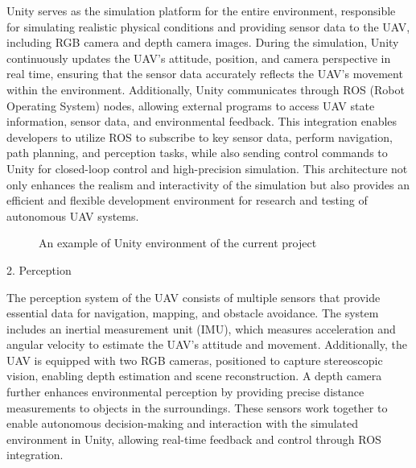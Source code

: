 \documentclass{article}
\begin{document}
Unity serves as the simulation platform for the entire environment, responsible for simulating realistic physical conditions and providing sensor data to the UAV, including RGB camera and depth camera images. During the simulation, Unity continuously updates the UAV's attitude, position, and camera perspective in real time, ensuring that the sensor data accurately reflects the UAV’s movement within the environment. Additionally, Unity communicates through ROS (Robot Operating System) nodes, allowing external programs to access UAV state information, sensor data, and environmental feedback. This integration enables developers to utilize ROS to subscribe to key sensor data, perform navigation, path planning, and perception tasks, while also sending control commands to Unity for closed-loop control and high-precision simulation. This architecture not only enhances the realism and interactivity of the simulation but also provides an efficient and flexible development environment for research and testing of autonomous UAV systems.
\begin{figure}[h]
    \centering
    \caption{An example of Unity environment of the current project}
    \label{fig:two_images}
\end{figure}

2. Perception

The perception system of the UAV consists of multiple sensors that provide essential data for navigation, mapping, and obstacle avoidance. The system includes an inertial measurement unit (IMU), which measures acceleration and angular velocity to estimate the UAV's attitude and movement. Additionally, the UAV is equipped with two RGB cameras, positioned to capture stereoscopic vision, enabling depth estimation and scene reconstruction. A depth camera further enhances environmental perception by providing precise distance measurements to objects in the surroundings. These sensors work together to enable autonomous decision-making and interaction with the simulated environment in Unity, allowing real-time feedback and control through ROS integration.
\end{document}
